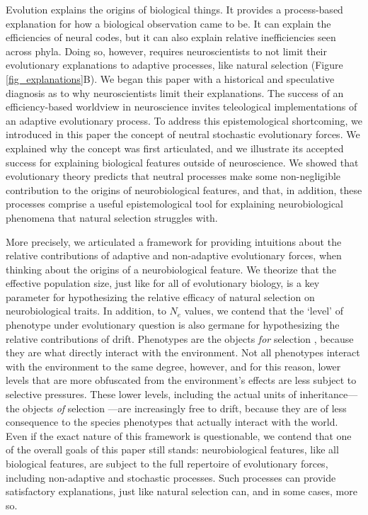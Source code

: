 \documentclass[twocolumn]{article}
\begin{document}
Evolution explains the origins of biological things. It provides a process-based explanation for how a biological observation came to be. It can explain the efficiencies of neural codes, but it can also explain relative inefficiencies seen across phyla. Doing so, however, requires neuroscientists to not limit their evolutionary explanations to adaptive processes, like natural selection (Figure \ref{fig_explanations}B). We began this paper with a historical and speculative diagnosis as to why neuroscientists limit their explanations. The success of an efficiency-based worldview in neuroscience invites teleological implementations of an adaptive evolutionary process. To address this epistemological shortcoming, we introduced in this paper the concept of neutral stochastic evolutionary forces. We explained why the concept was first articulated, and we illustrate its accepted success for explaining biological features outside of neuroscience. We showed that evolutionary theory predicts that neutral processes make some non-negligible contribution to the origins of neurobiological features, and that, in addition, these processes comprise a useful epistemological tool for explaining neurobiological phenomena that natural selection struggles with. 

More precisely, we articulated a framework for providing intuitions about the relative contributions of adaptive and non-adaptive evolutionary forces, when thinking about the origins of a neurobiological feature. We theorize that the effective population size, just like for all of evolutionary biology, is a key parameter for hypothesizing the relative efficacy of natural selection on neurobiological traits. In addition, to $N_e$ values, we contend that the `level' of phenotype under evolutionary question is also germane for hypothesizing the relative contributions of drift. Phenotypes are the objects \textit{for} selection \cite{mayr_1997, sober1993nature}, because they are what directly interact with the environment. Not all phenotypes interact with the environment to the same degree, however, and for this reason, lower levels that are more obfuscated from the environment's effects are less subject to selective pressures. These lower levels, including the actual units of inheritance---the objects \textit{of} selection \cite{mayr_1997, sober1993nature}---are increasingly free to drift, because they are of less consequence to the species phenotypes that actually interact with the world. Even if the exact nature of this framework is questionable, we contend that one of the overall goals of this paper still stands: neurobiological features, like all biological features, are subject to the full repertoire of evolutionary forces, including non-adaptive and stochastic processes. Such processes can provide satisfactory explanations, just like natural selection can, and in some cases, more so. 
\end{document}
